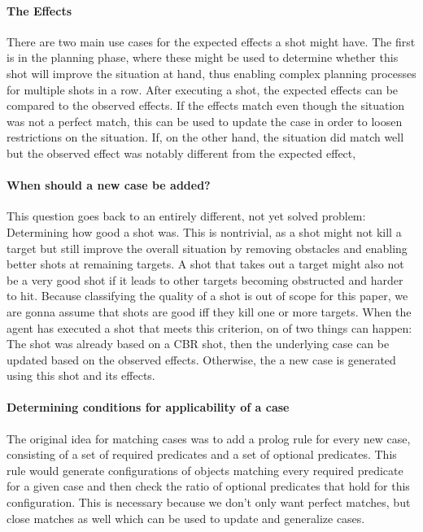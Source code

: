 \paragraph{The Effects}
There are two main use cases for the expected effects a shot might have. The first is in the planning phase, where these might be used to determine whether this shot will improve the situation at hand, thus enabling complex planning processes for multiple shots in a row.
After executing a shot, the expected effects can be compared to the observed effects. If the effects match even though the situation was not a perfect match, this can be used to update the case in order to loosen restrictions on the situation.
If, on the other hand, the situation did match well but the observed effect was notably different from the expected effect,

\paragraph{When should a new case be added?}
This question goes back to an entirely different, not yet solved problem: Determining how good a shot was.
This is nontrivial, as a shot might not kill a target but still improve the overall situation by removing obstacles and enabling better shots at remaining targets.
A shot that takes out a target might also not be a very good shot if it leads to other targets becoming obstructed and harder to hit.
Because classifying the quality of a shot is out of scope for this paper, we are gonna assume that shots are good iff they kill one or more targets.
When the agent has executed a shot that meets this criterion, on of two things can happen: The shot was already based on a CBR shot, then the underlying case can be updated based on the observed effects. Otherwise, the a new case is generated using this shot and its effects.

\paragraph{Determining conditions for applicability of a case}
The original idea for matching cases was to add a prolog rule for every new case, consisting of a set of required predicates and a set of optional predicates.
This rule would generate configurations of objects matching every required predicate for a given case and then check the ratio of optional predicates that hold for this configuration.
This is necessary because we don't only want perfect matches, but close matches as well which can be used to update and generalize cases.

